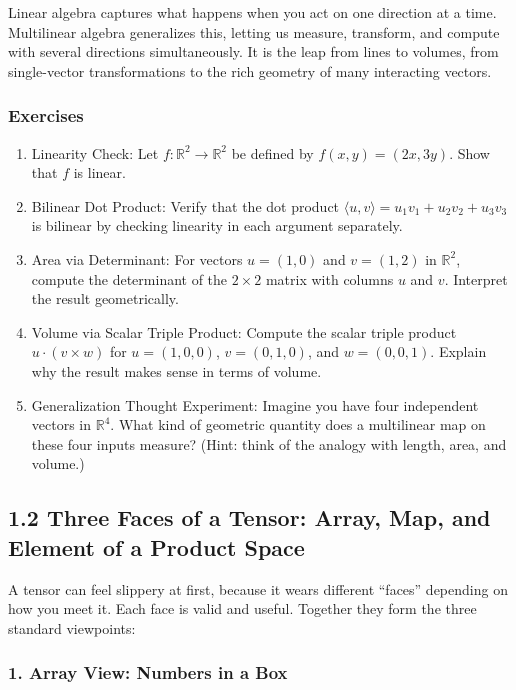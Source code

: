 \documentclass[
  letterpaper,
  DIV=11,
  numbers=noendperiod]{scrreprt}
\begin{document}
Linear algebra captures what happens when you act on one direction at a
time. Multilinear algebra generalizes this, letting us measure,
transform, and compute with several directions simultaneously. It is the
leap from lines to volumes, from single-vector transformations to the
rich geometry of many interacting vectors.

\subsubsection{Exercises}\label{exercises}

\begin{enumerate}
\def\labelenumi{\arabic{enumi}.}
\item
  Linearity Check: Let \(f:\mathbb{R}^2 \to \mathbb{R}^2\) be defined by
  \(f(x,y) = (2x, 3y)\). Show that \(f\) is linear.
\item
  Bilinear Dot Product: Verify that the dot product
  \(\langle u, v \rangle = u_1 v_1 + u_2 v_2 + u_3 v_3\) is bilinear by
  checking linearity in each argument separately.
\item
  Area via Determinant: For vectors \(u = (1,0)\) and \(v = (1,2)\) in
  \(\mathbb{R}^2\), compute the determinant of the \(2 \times 2\) matrix
  with columns \(u\) and \(v\). Interpret the result geometrically.
\item
  Volume via Scalar Triple Product: Compute the scalar triple product
  \(u \cdot (v \times w)\) for \(u = (1,0,0)\), \(v = (0,1,0)\), and
  \(w = (0,0,1)\). Explain why the result makes sense in terms of
  volume.
\item
  Generalization Thought Experiment: Imagine you have four independent
  vectors in \(\mathbb{R}^4\). What kind of geometric quantity does a
  multilinear map on these four inputs measure? (Hint: think of the
  analogy with length, area, and volume.)
\end{enumerate}

\subsection{1.2 Three Faces of a Tensor: Array, Map, and Element of a
Product
Space}\label{three-faces-of-a-tensor-array-map-and-element-of-a-product-space}

A tensor can feel slippery at first, because it wears different
``faces'' depending on how you meet it. Each face is valid and useful.
Together they form the three standard viewpoints:

\subsubsection{1. Array View: Numbers in a
Box}\label{array-view-numbers-in-a-box}
\end{document}
